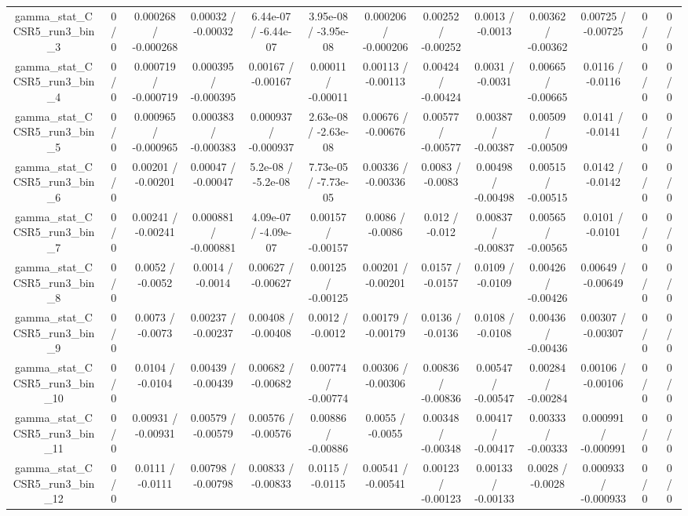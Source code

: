 \documentclass[10pt]{article}
\begin{document}
\begin{table}[htbp]
\begin{center}
\begin{tabular}{|c|c|c|c|c|c|c|c|c|c|c|c|c|}
  gamma_stat_CCSR5_run3_bin_3 & 0 / 0 & 0.000268 / -0.000268 & 0.00032 / -0.00032 & 6.44e-07 / -6.44e-07 & 3.95e-08 / -3.95e-08 & 0.000206 / -0.000206 & 0.00252 / -0.00252 & 0.0013 / -0.0013 & 0.00362 / -0.00362 & 0.00725 / -0.00725 & 0 / 0 & 0 / 0 \\ 
  gamma_stat_CCSR5_run3_bin_4 & 0 / 0 & 0.000719 / -0.000719 & 0.000395 / -0.000395 & 0.00167 / -0.00167 & 0.00011 / -0.00011 & 0.00113 / -0.00113 & 0.00424 / -0.00424 & 0.0031 / -0.0031 & 0.00665 / -0.00665 & 0.0116 / -0.0116 & 0 / 0 & 0 / 0 \\ 
  gamma_stat_CCSR5_run3_bin_5 & 0 / 0 & 0.000965 / -0.000965 & 0.000383 / -0.000383 & 0.000937 / -0.000937 & 2.63e-08 / -2.63e-08 & 0.00676 / -0.00676 & 0.00577 / -0.00577 & 0.00387 / -0.00387 & 0.00509 / -0.00509 & 0.0141 / -0.0141 & 0 / 0 & 0 / 0 \\ 
  gamma_stat_CCSR5_run3_bin_6 & 0 / 0 & 0.00201 / -0.00201 & 0.00047 / -0.00047 & 5.2e-08 / -5.2e-08 & 7.73e-05 / -7.73e-05 & 0.00336 / -0.00336 & 0.0083 / -0.0083 & 0.00498 / -0.00498 & 0.00515 / -0.00515 & 0.0142 / -0.0142 & 0 / 0 & 0 / 0 \\ 
  gamma_stat_CCSR5_run3_bin_7 & 0 / 0 & 0.00241 / -0.00241 & 0.000881 / -0.000881 & 4.09e-07 / -4.09e-07 & 0.00157 / -0.00157 & 0.0086 / -0.0086 & 0.012 / -0.012 & 0.00837 / -0.00837 & 0.00565 / -0.00565 & 0.0101 / -0.0101 & 0 / 0 & 0 / 0 \\ 
  gamma_stat_CCSR5_run3_bin_8 & 0 / 0 & 0.0052 / -0.0052 & 0.0014 / -0.0014 & 0.00627 / -0.00627 & 0.00125 / -0.00125 & 0.00201 / -0.00201 & 0.0157 / -0.0157 & 0.0109 / -0.0109 & 0.00426 / -0.00426 & 0.00649 / -0.00649 & 0 / 0 & 0 / 0 \\ 
  gamma_stat_CCSR5_run3_bin_9 & 0 / 0 & 0.0073 / -0.0073 & 0.00237 / -0.00237 & 0.00408 / -0.00408 & 0.0012 / -0.0012 & 0.00179 / -0.00179 & 0.0136 / -0.0136 & 0.0108 / -0.0108 & 0.00436 / -0.00436 & 0.00307 / -0.00307 & 0 / 0 & 0 / 0 \\ 
  gamma_stat_CCSR5_run3_bin_10 & 0 / 0 & 0.0104 / -0.0104 & 0.00439 / -0.00439 & 0.00682 / -0.00682 & 0.00774 / -0.00774 & 0.00306 / -0.00306 & 0.00836 / -0.00836 & 0.00547 / -0.00547 & 0.00284 / -0.00284 & 0.00106 / -0.00106 & 0 / 0 & 0 / 0 \\ 
  gamma_stat_CCSR5_run3_bin_11 & 0 / 0 & 0.00931 / -0.00931 & 0.00579 / -0.00579 & 0.00576 / -0.00576 & 0.00886 / -0.00886 & 0.0055 / -0.0055 & 0.00348 / -0.00348 & 0.00417 / -0.00417 & 0.00333 / -0.00333 & 0.000991 / -0.000991 & 0 / 0 & 0 / 0 \\ 
  gamma_stat_CCSR5_run3_bin_12 & 0 / 0 & 0.0111 / -0.0111 & 0.00798 / -0.00798 & 0.00833 / -0.00833 & 0.0115 / -0.0115 & 0.00541 / -0.00541 & 0.00123 / -0.00123 & 0.00133 / -0.00133 & 0.0028 / -0.0028 & 0.000933 / -0.000933 & 0 / 0 & 0 / 0 \\ 

\end{tabular}
\end{center}
\end{table}
\end{document}
